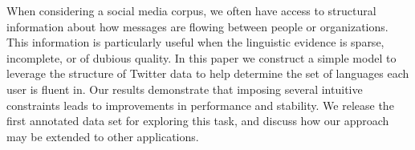 When considering a social media corpus, we often have access to structural information about how messages are flowing between people or organizations. This information is particularly useful when the linguistic evidence is sparse, incomplete, or of dubious quality.  In this paper we construct a simple model to leverage the structure of Twitter data to help determine the set of languages each user is fluent in.  Our results demonstrate that imposing several intuitive constraints leads to improvements in performance and stability.  We release the first annotated data set for exploring this task, and discuss how our approach may be extended to other applications.
